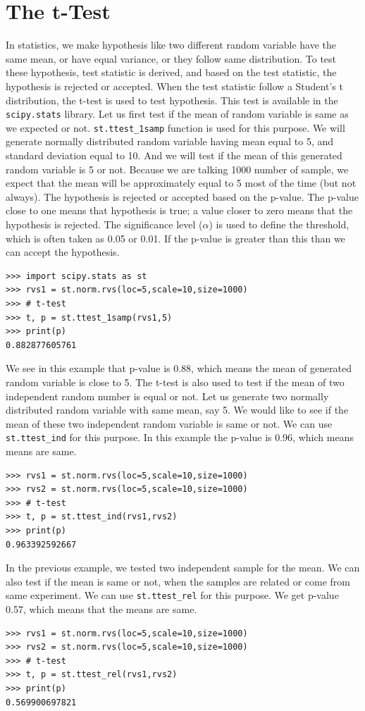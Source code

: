 \documentclass[10pt]{book}
\begin{document}
{\section{The t-Test}
In statistics, we make hypothesis like two different random variable have the same mean, or have equal variance, or they follow same distribution. To test these hypothesis, test statistic is derived, and based on the test statistic, the hypothesis is rejected or accepted. When the test statistic follow a Student's t distribution, the t-test is used to test hypothesis. This test is available in the \verb"scipy.stats" library. Let us first test if the mean of random variable is same as we expected or not. \verb"st.ttest_1samp" function is used for this purpose. We will generate normally distributed random variable having mean equal to 5, and standard deviation equal to 10. And we will test if the mean of this generated random variable is 5 or not. Because we are talking 1000 number of sample, we expect that the mean will be approximately equal to 5 most of the time (but not always). The hypothesis is rejected or accepted based on the p-value. The p-value close to one means that hypothesis is true; a value 
closer to zero means that the hypothesis is rejected. The significance level ($\alpha$) is used to define the threshold, which is often taken as 0.05 or 0.01. If the p-value is greater than this than we can accept the hypothesis. 
\beforeverb \begin{verbatim}
>>> import scipy.stats as st
>>> rvs1 = st.norm.rvs(loc=5,scale=10,size=1000)
>>> # t-test
>>> t, p = st.ttest_1samp(rvs1,5)
>>> print(p)
0.882877605761
\end{verbatim} \afterverb
We see in this example that p-value is 0.88, which means the mean of generated random variable is close to 5. The t-test is also used to test if the mean of two independent random number is equal or not. Let us generate two normally distributed random variable with same mean, say 5. We would like to see if the mean of these two independent random variable is same or not. We can use \verb"st.ttest_ind" for this purpose. In this example the p-value is 0.96, which means means are same.
\beforeverb \begin{verbatim}
>>> rvs1 = st.norm.rvs(loc=5,scale=10,size=1000)
>>> rvs2 = st.norm.rvs(loc=5,scale=10,size=1000)
>>> # t-test
>>> t, p = st.ttest_ind(rvs1,rvs2)
>>> print(p)
0.963392592667
\end{verbatim} \afterverb

In the previous example, we tested two independent sample for the mean. We can also test if the mean is same or not, when the samples are related or come from same experiment. We can use \verb"st.ttest_rel" for this purpose. We get p-value 0.57, which means that the means are same.
\beforeverb \begin{verbatim}
>>> rvs1 = st.norm.rvs(loc=5,scale=10,size=1000)
>>> rvs2 = st.norm.rvs(loc=5,scale=10,size=1000)
>>> # t-test
>>> t, p = st.ttest_rel(rvs1,rvs2)
>>> print(p)
0.569900697821
\end{verbatim} \afterverb

}
\end{document}
